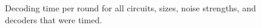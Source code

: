 \documentclass[onecolumn,unpublished,a4paper]{quantumarticle}
\theoremstyle{definition}
\theoremstyle{definition}
\theoremstyle{definition}
\begin{document}
\begin{figure}
    \centering
    \caption{
        Decoding time per round for all circuits, sizes, noise strengths, and decoders that were timed.
    }
    \label{fig:timing_r_full}
\end{figure}
\end{document}
